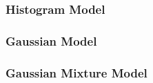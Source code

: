 
\subsubsection{Histogram Model}
\subsubsection{Gaussian Model}
\subsubsection{Gaussian Mixture Model}
